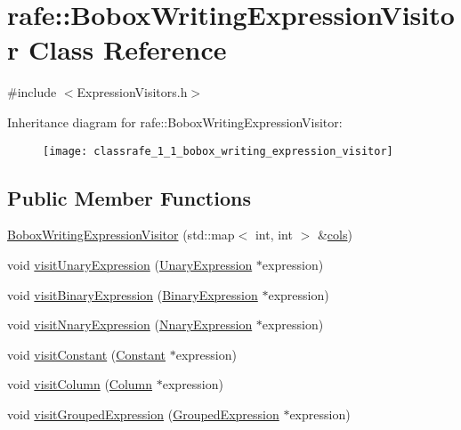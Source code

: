 \hypertarget{classrafe_1_1_bobox_writing_expression_visitor}{\section{rafe\+:\+:Bobox\+Writing\+Expression\+Visitor Class Reference}
\label{classrafe_1_1_bobox_writing_expression_visitor}
}


{\ttfamily \#include $<$Expression\+Visitors.\+h$>$}

Inheritance diagram for rafe\+:\+:Bobox\+Writing\+Expression\+Visitor\+:\begin{figure}[H]
\begin{center}
\leavevmode
\texttt{[image: classrafe\_1\_1\_bobox\_writing\_expression\_visitor]}
\end{center}
\end{figure}
\subsection*{Public Member Functions}
\begin{DoxyCompactItemize}
\item 
\hyperlink{classrafe_1_1_bobox_writing_expression_visitor_a212bf9dc5e42e80474f33bc3c2476020}{Bobox\+Writing\+Expression\+Visitor} (std\+::map$<$ int, int $>$ \&\hyperlink{classrafe_1_1_bobox_writing_expression_visitor_af77757b532d04695137bfa1a4e408f5c}{cols})
\item 
void \hyperlink{classrafe_1_1_bobox_writing_expression_visitor_aa2ebbdd925b785deb29d0ee1f326d917}{visit\+Unary\+Expression} (\hyperlink{classrafe_1_1_unary_expression}{Unary\+Expression} $\ast$expression)
\item 
void \hyperlink{classrafe_1_1_bobox_writing_expression_visitor_a4bf6fe93d12d89e40d30ef811442e666}{visit\+Binary\+Expression} (\hyperlink{classrafe_1_1_binary_expression}{Binary\+Expression} $\ast$expression)
\item 
void \hyperlink{classrafe_1_1_bobox_writing_expression_visitor_a4d004f836ea9b45c8a08de32cb72bdb3}{visit\+Nnary\+Expression} (\hyperlink{classrafe_1_1_nnary_expression}{Nnary\+Expression} $\ast$expression)
\item 
void \hyperlink{classrafe_1_1_bobox_writing_expression_visitor_a2228a1d5a64ae2ef765f5360b5eb9a30}{visit\+Constant} (\hyperlink{classrafe_1_1_constant}{Constant} $\ast$expression)
\item 
void \hyperlink{classrafe_1_1_bobox_writing_expression_visitor_a7c431ef8456be3affdb17692b99d8e50}{visit\+Column} (\hyperlink{classrafe_1_1_column}{Column} $\ast$expression)
\item 
void \hyperlink{classrafe_1_1_bobox_writing_expression_visitor_a5c00ebe39e50c4e6ad35f35a1248ef8e}{visit\+Grouped\+Expression} (\hyperlink{classrafe_1_1_grouped_expression}{Grouped\+Expression} $\ast$expression)
\end{DoxyCompactItemize}
